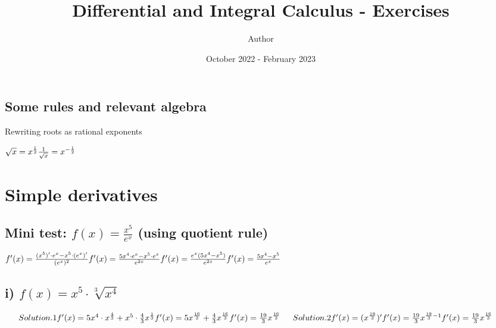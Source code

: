 \documentclass{article}
\title{Differential and Integral Calculus - Exercises}
\author{Author}
\date{October 2022 - February 2023}
\begin{document}
\maketitle

\subsection{Some rules and relevant algebra}
Rewriting roots as rational exponents

$
\\
\sqrt{x} = x^{\frac{1}{2}}
\\
\\
\frac{1}{\sqrt{x}} = x^{-\frac{1}{2}}
$

\section{Simple derivatives}

\subsection{Mini test: $f(x) = \frac{x^5}{e^x}$ (using quotient rule)}
$
  f'(x) = \frac{(x^5)' \cdot e^x - x^5 \cdot (e^x)'}{(e^x)^2}
  \\
  \\
  f'(x) = \frac{5x^4 \cdot e^x - x^5 \cdot e^x}{e^{2x}}
  \\
  \\
  f'(x) = \frac{e^x (5x^4 - x^5)}{e^{2x}}
  \\
  \\
  f'(x) = \frac{5x^4 - x^5}{e^x}
$

\subsection{i) $f(x) = x^5 \cdot \sqrt[3]{x^4}$}
$
  \indent Solution.1
  \\
  \\
  f'(x) = 5x^4 \cdot x^\frac{4}{3} + x^5 \cdot \frac{4}{3}x^\frac{1}{3}
  \\
  \\
  f'(x) = 5x^\frac{16}{3} + \frac{4}{3}x^\frac{16}{3}
  \\
  \\
  f'(x) = \frac{19}{3}x^\frac{16}{3}
  \\
  \\
  \indent Solution.2
  \\
  \\
  f'(x) = (x^\frac{19}{3})'
  \\
  \\
  f'(x) = \frac{19}{3}x^{\frac{19}{3}-1}
  \\
  \\
  f'(x) = \frac{19}{3}x^\frac{16}{3}
$
\end{document}
